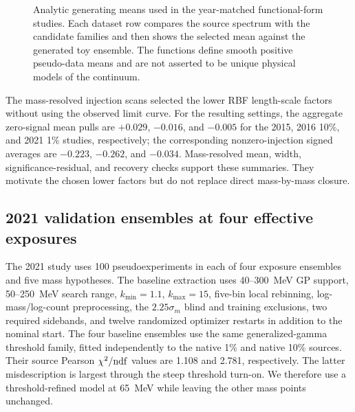 \begin{figure}[p]
\centering
{}
\caption{Analytic generating means used in the year-matched functional-form studies.
Each dataset row compares the source spectrum with the candidate families and then
shows the selected mean against the generated toy ensemble.  The functions define
smooth positive pseudo-data means and are not asserted to be unique physical models
of the continuum.}
\label{fig:v491-functional-form-seed-overview}
\end{figure}

The mass-resolved injection scans selected the lower RBF length-scale factors without
using the observed limit curve. For the resulting settings, the aggregate zero-signal
mean pulls are $+0.029$, $-0.016$, and $-0.005$ for the 2015, 2016 10\%, and 2021
1\% studies, respectively; the corresponding nonzero-injection signed averages are
$-0.223$, $-0.262$, and $-0.034$.  Mass-resolved mean, width,
significance-residual, and recovery checks support these summaries.  They motivate the
chosen lower factors but do not replace direct mass-by-mass
closure.

\subsection{2021 validation ensembles at four effective exposures}
\label{sec:v491-four-lane-ensemble}

The 2021 study uses 100 pseudoexperiments in each of four exposure ensembles and five
mass hypotheses. The baseline extraction uses 40--300~MeV GP
support, 50--250~MeV search range, $k_{\min}=1.1$, $k_{\max}=15$,
five-bin local rebinning, log-mass/log-count preprocessing, the
$2.25\sigma_m$ blind and training exclusions, two required sidebands, and twelve
randomized optimizer restarts in addition to the nominal start. The four baseline
ensembles use the same generalized-gamma threshold family, fitted independently to the
native 1\% and native 10\% sources.  Their source Pearson
$\chi^2/{\rm ndf}$ values are 1.108 and 2.781, respectively.  The latter
misdescription is largest through the steep threshold
turn-on. We therefore use a threshold-refined model at 65~MeV while leaving the other
mass points unchanged.

